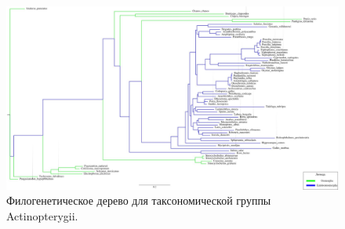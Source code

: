 \begin{figure}[h] %
    \centering
    \includegraphics[width=1.0\textwidth]{images/Actinopterygii_tree}
    \caption{Филогенетическое дерево для таксономической группы Actinopterygii.}
    \label{fig:Actinopterygii_tree}
\end{figure}
